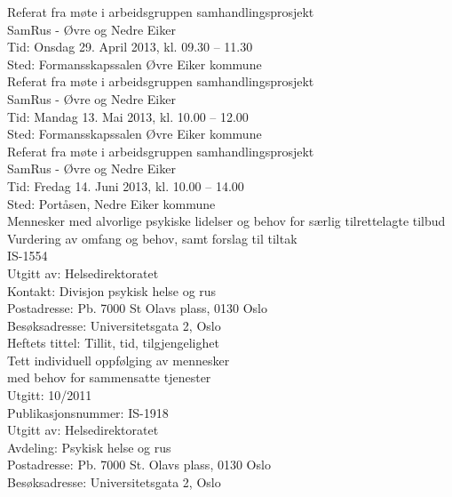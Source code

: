 \documentclass[11pt]{report} %
\begin{document}
\begin{thebibliography}{99}
                  Referat fra møte i arbeidsgruppen samhandlingsprosjekt\\ 
                  SamRus - Øvre og Nedre Eiker\\
                  Tid: Onsdag 29. April 2013,  kl. 09.30 – 11.30\\
                  Sted: Formansskapssalen Øvre Eiker kommune\\

                  Referat fra møte i arbeidsgruppen samhandlingsprosjekt\\ 
                  SamRus - Øvre og Nedre Eiker\\
                  Tid: Mandag 13. Mai 2013,  kl. 10.00 – 12.00\\
                  Sted: Formansskapssalen Øvre Eiker kommune\\

                  Referat fra møte i arbeidsgruppen samhandlingsprosjekt\\ 
                  SamRus - Øvre og Nedre Eiker\\
                  Tid: Fredag 14. Juni 2013,  kl. 10.00 – 14.00\\
                  Sted: Portåsen, Nedre Eiker kommune\\

                  Mennesker med alvorlige psykiske lidelser og behov for særlig tilrettelagte tilbud Vurdering av omfang og behov, samt forslag til tiltak\\
                  IS-1554\\
                  Utgitt av: Helsedirektoratet\\
                  Kontakt: Divisjon psykisk helse og rus\\
                  Postadresse: Pb. 7000 St Olavs plass, 0130 Oslo\\
                  Besøksadresse: Universitetsgata 2, Oslo\\

                  Heftets tittel: Tillit, tid, tilgjengelighet\\
                  Tett individuell oppfølging av mennesker\\
                  med behov for sammensatte tjenester\\
                  Utgitt: 10/2011\\
                  Publikasjonsnummer: IS-1918\\
                  Utgitt av: Helsedirektoratet\\
                  Avdeling: Psykisk helse og rus\\
                  Postadresse: Pb. 7000 St. Olavs plass, 0130 Oslo\\
                  Besøksadresse: Universitetsgata 2, Oslo\\


\end{thebibliography}
\end{document}
